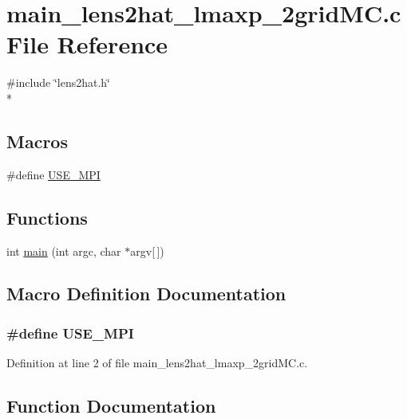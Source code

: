 \section{main\-\_\-lens2hat\-\_\-lmaxp\-\_\-2grid\-M\-C.\-c File Reference}
\label{main__lens2hat__lmaxp__2gridMC_8c}
{\ttfamily \#include \char`\"{}lens2hat.\-h\char`\"{}}\\*
\subsection*{Macros}
\begin{DoxyCompactItemize}
\item 
\#define \hyperlink{main__lens2hat__lmaxp__2gridMC_8c_a3869d282031f6ea6b50fdb980b758420}{U\-S\-E\-\_\-\-M\-P\-I}
\end{DoxyCompactItemize}
\subsection*{Functions}
\begin{DoxyCompactItemize}
\item 
int \hyperlink{main__lens2hat__lmaxp__2gridMC_8c_a0ddf1224851353fc92bfbff6f499fa97}{main} (int argc, char $\ast$argv\mbox{[}$\,$\mbox{]})
\end{DoxyCompactItemize}


\subsection{Macro Definition Documentation}
\subsubsection[{U\-S\-E\-\_\-\-M\-P\-I}]{\setlength{\rightskip}{0pt plus 5cm}\#define U\-S\-E\-\_\-\-M\-P\-I}\label{main__lens2hat__lmaxp__2gridMC_8c_a3869d282031f6ea6b50fdb980b758420}


Definition at line 2 of file main\-\_\-lens2hat\-\_\-lmaxp\-\_\-2grid\-M\-C.\-c.



\subsection{Function Documentation}
